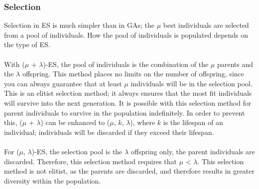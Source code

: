 \subsubsection{Selection}
Selection in ES is much simpler than in GAs; the $\mu$ best individuals are selected from a pool of individuals. How the pool of individuals is populated depends on the type of ES. 
\\\\With ($\mu$ + $\lambda$)-ES, the pool of individuals is the combination of the $\mu$ parents and the $\lambda$ offspring. This method places no limits on the number of offspring, since you can always guarantee that at least $\mu$ individuals will be in the selection pool. This is an elitist selection method; it always ensures that the most fit individuals will survive into the next generation\cite{4-es, es, esc}. It is possible with this selection method for parent individuals to survive in the population indefinitely. In order to prevent this, ($\mu$ + $\lambda$) can be enhanced to ($\mu$, $k$, $\lambda$), where $k$ is the lifespan of an individual; individuals will be discarded if they exceed their lifespan\cite{4-es}.
\\\\For ($\mu$, $\lambda$)-ES, the selection pool is the $\lambda$ offspring only, the parent individuals are discarded. Therefore, this selection method requires that $\mu$ < $\lambda$. This selection method is not elitist, as the parents are discarded, and therefore results in greater diversity within the population\cite{4-es, es, esc}.

